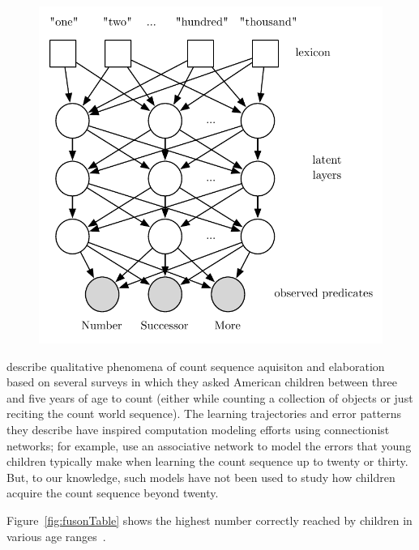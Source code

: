 \documentclass[10pt,letterpaper]{article}
\begin{document}
\begin{figure}[t]
\includegraphics[width=0.9\linewidth]{figures/lpn}
\end{figure}



\citet{FusRicBriar1982} describe qualitative phenomena of
count sequence aquisiton and elaboration based on several surveys in
which they asked American children between three and five years of age
to count (either while counting a collection of objects or just
reciting the count world sequence). The learning trajectories and
error patterns they describe have inspired computation modeling
efforts using connectionist networks; for example,
\citet{ma1989modeling} use an associative network to model the errors
that young children typically make when learning the count sequence up
to twenty or thirty. But, to our knowledge, such models have not been
used to study how children acquire the count sequence beyond twenty.

Figure~\ref{fig:fusonTable} shows the highest number correctly reached
by children in various age ranges~\cite{FusRicBriar1982}. 
\end{document}
